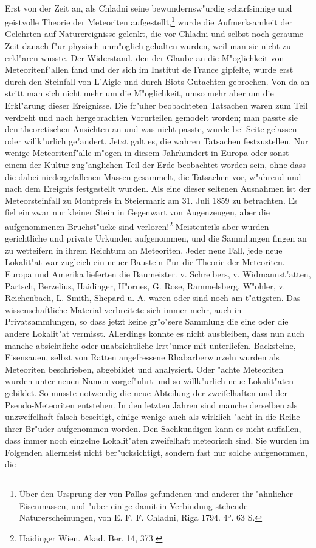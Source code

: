 \documentclass[a4paper, 11pt, oneside]{article}
\begin{document}
\paragraph{}
Erst von der Zeit an, als Chladni seine bewundernsw"urdig scharfsinnige und geistvolle Theorie der Meteoriten aufgestellt,\footnote{Über den Ursprung der von Pallas gefundenen und anderer ihr "ahnlicher Eisenmassen, und "uber einige damit in Verbindung stehende Naturerscheinungen, von E. F. F. Chladni, Riga 1794. 4º. 63 S.} wurde die Aufmerksamkeit der Gelehrten auf Naturereignisse gelenkt, die vor Chladni und selbst noch geraume Zeit danach f"ur physisch unm"oglich gehalten wurden, weil man sie nicht zu erkl"aren wusste. Der Widerstand, den der Glaube an die M"oglichkeit von Meteoritenf"allen fand und der sich im Institut de France gipfelte, wurde erst durch den Steinfall von L'Aigle und durch Biots Gutachten gebrochen. Von da an stritt man sich nicht mehr um die M"oglichkeit, umso mehr aber um die Erkl"arung dieser Ereignisse. Die fr"uher beobachteten Tatsachen waren zum Teil verdreht und nach hergebrachten Vorurteilen gemodelt worden; man passte sie den theoretischen Ansichten an und was nicht passte, wurde bei Seite gelassen oder willk"urlich ge"andert. Jetzt galt es, die wahren Tatsachen festzustellen. Nur wenige Meteoritenf"alle m"ogen in diesem Jahrhundert in Europa oder sonst einem der Kultur zug"anglichen Teil der Erde beobachtet worden sein, ohne dass die dabei niedergefallenen Massen gesammelt, die Tatsachen vor, w"ahrend und nach dem Ereignis festgestellt wurden. Als eine dieser seltenen Ausnahmen ist der Meteorsteinfall zu Montpreis in Steiermark am 31. Juli 1859 zu betrachten. Es fiel ein zwar nur kleiner Stein in Gegenwart von Augenzeugen, aber die aufgenommenen Bruchst"ucke sind verloren!\footnote{Haidinger Wien. Akad. Ber. 14, 373.} Meistenteils aber wurden gerichtliche und private Urkunden aufgenommen, und die Sammlungen fingen an zu wetteifern in ihrem Reichtum an Meteoriten. Jeder neue Fall, jede neue Lokalit"at war zugleich ein neuer Baustein f"ur die Theorie der Meteoriten. Europa und Amerika lieferten die Baumeister. v. Schreibers, v. Widmannst"atten, Partsch, Berzelius, Haidinger, H"ornes, G. Rose, Rammelsberg, W"ohler, v. Reichenbach, L. Smith, Shepard u. A. waren oder sind noch am t"atigsten. Das wissenschaftliche Material verbreitete sich immer mehr, auch in Privatsammlungen, so dass jetzt keine gr"o"sere Sammlung die eine oder die andere Lokalit"at vermisst. Allerdings konnte es nicht ausbleiben, dass nun auch manche absichtliche oder unabsichtliche Irrt"umer mit unterliefen. Backsteine, Eisensauen, selbst von Ratten angefressene Rhabarberwurzeln wurden als Meteoriten beschrieben, abgebildet und analysiert. Oder "achte Meteoriten wurden unter neuen Namen vorgef"uhrt und so willk"urlich neue Lokalit"aten gebildet. So musste notwendig die neue Abteilung der zweifelhaften und der Pseudo-Meteoriten entstehen. In den letzten Jahren sind manche derselben als unzweifelhaft falsch beseitigt, einige wenige auch als wirklich "acht in die Reihe ihrer Br"uder aufgenommen worden. Den Sachkundigen kann es nicht auffallen, dass immer noch einzelne Lokalit"aten zweifelhaft meteorisch sind. Sie wurden im Folgenden allermeist nicht ber"ucksichtigt, sondern fast nur solche aufgenommen, die 
\end{document}
